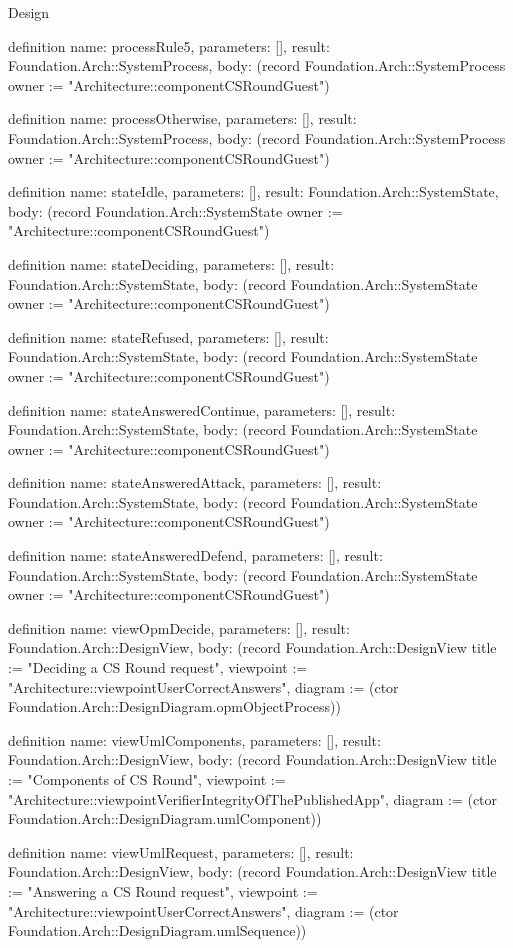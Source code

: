 \begin{lexlean}{Design}
\begin{semanticmodule}
definition{
  name: processRule5,
  parameters: [],
  result: Foundation.Arch::SystemProcess,
  body: (record Foundation.Arch::SystemProcess {owner := "Architecture::componentCSRoundGuest"})
}

definition{
  name: processOtherwise,
  parameters: [],
  result: Foundation.Arch::SystemProcess,
  body: (record Foundation.Arch::SystemProcess {owner := "Architecture::componentCSRoundGuest"})
}

definition{
  name: stateIdle,
  parameters: [],
  result: Foundation.Arch::SystemState,
  body: (record Foundation.Arch::SystemState {owner := "Architecture::componentCSRoundGuest"})
}

definition{
  name: stateDeciding,
  parameters: [],
  result: Foundation.Arch::SystemState,
  body: (record Foundation.Arch::SystemState {owner := "Architecture::componentCSRoundGuest"})
}

definition{
  name: stateRefused,
  parameters: [],
  result: Foundation.Arch::SystemState,
  body: (record Foundation.Arch::SystemState {owner := "Architecture::componentCSRoundGuest"})
}

definition{
  name: stateAnsweredContinue,
  parameters: [],
  result: Foundation.Arch::SystemState,
  body: (record Foundation.Arch::SystemState {owner := "Architecture::componentCSRoundGuest"})
}

definition{
  name: stateAnsweredAttack,
  parameters: [],
  result: Foundation.Arch::SystemState,
  body: (record Foundation.Arch::SystemState {owner := "Architecture::componentCSRoundGuest"})
}

definition{
  name: stateAnsweredDefend,
  parameters: [],
  result: Foundation.Arch::SystemState,
  body: (record Foundation.Arch::SystemState {owner := "Architecture::componentCSRoundGuest"})
}

definition{
  name: viewOpmDecide,
  parameters: [],
  result: Foundation.Arch::DesignView,
  body: (record Foundation.Arch::DesignView {title := "Deciding a CS Round request", viewpoint := "Architecture::viewpointUserCorrectAnswers", diagram := (ctor Foundation.Arch::DesignDiagram.opmObjectProcess)})
}

definition{
  name: viewUmlComponents,
  parameters: [],
  result: Foundation.Arch::DesignView,
  body: (record Foundation.Arch::DesignView {title := "Components of CS Round", viewpoint := "Architecture::viewpointVerifierIntegrityOfThePublishedApp", diagram := (ctor Foundation.Arch::DesignDiagram.umlComponent)})
}

definition{
  name: viewUmlRequest,
  parameters: [],
  result: Foundation.Arch::DesignView,
  body: (record Foundation.Arch::DesignView {title := "Answering a CS Round request", viewpoint := "Architecture::viewpointUserCorrectAnswers", diagram := (ctor Foundation.Arch::DesignDiagram.umlSequence)})
}


\end{semanticmodule}
\end{lexlean}
